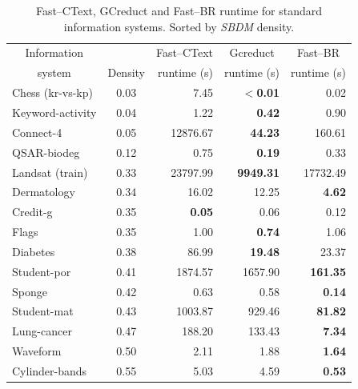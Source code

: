 \documentclass[number,preprint,review,12pt]{elsarticle}
\begin{document}
	\begin{table}[htb]
		\centering
		\caption{Fast--CText, GCreduct and Fast--BR runtime for standard information systems. Sorted by \textit{SBDM} density.}
		\label{tab:density}
		\begin{tabular}{|l|c|r|r|r|}
			\hline
			\multicolumn{1}{|c|}{Information}  && Fast--CText & \multicolumn{1}{c|}{Gcreduct} & \multicolumn{1}{c|}{Fast--BR}  \\
			\multicolumn{1}{|c|}{system}       & Density & runtime (s) & runtime (s)  & runtime (s)  \\
			\hline
			Chess (kr-vs-kp)          & 0.03    & 7.45          & \textbf{$<$0.01} & 0.02            \\
			Keyword-activity          & 0.04    & 1.22          & \textbf{0.42}    & 0.90            \\
			Connect-4                 & 0.05    & 12876.67      & \textbf{44.23}   & 160.61          \\
			QSAR-biodeg               & 0.12    & 0.75          & \textbf{0.19}    & 0.33            \\
			Landsat (train)           & 0.33    & 23797.99      & \textbf{9949.31} & 17732.49        \\
			Dermatology               & 0.34    & 16.02         & 12.25            & \textbf{4.62}   \\
			Credit-g                  & 0.35    & \textbf{0.05} & 0.06             & 0.12            \\
			Flags                     & 0.35    & 1.00          & \textbf{0.74}    & 1.06            \\
			Diabetes                  & 0.38    & 86.99         & \textbf{19.48}   & 23.37           \\
			Student-por               & 0.41    & 1874.57       & 1657.90          & \textbf{161.35} \\
			Sponge                    & 0.42    & 0.63          & 0.58             & \textbf{0.14}   \\
			Student-mat               & 0.43    & 1003.87       & 929.46           & \textbf{81.82}  \\
			Lung-cancer               & 0.47    & 188.20        & 133.43           & \textbf{7.34}   \\
			Waveform                  & 0.50    & 2.11          & 1.88             & \textbf{1.64}   \\
			Cylinder-bands            & 0.55    & 5.03          & 4.59             & \textbf{0.53}   \\
			\hline
		\end{tabular}
	\end{table}
	
\end{document}
